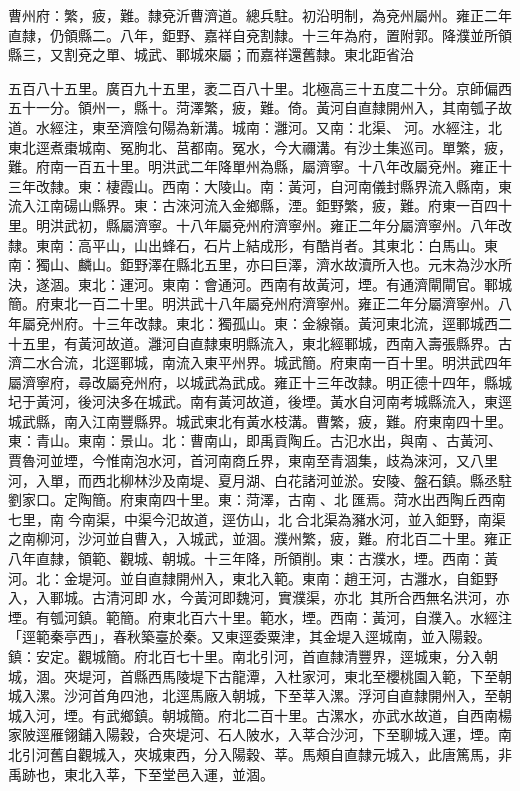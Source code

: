 \begin{pinyinscope}
曹州府：繁，疲，難。隸兗沂曹濟道。總兵駐。初沿明制，為兗州屬州。雍正二年直隸，仍領縣二。八年，鉅野、嘉祥自兗割隸。十三年為府，置附郭。降濮並所領縣三，又割兗之單、城武、鄆城來屬；而嘉祥還舊隸。東北距省治

五百八十五里。廣百九十五里，袤二百八十里。北極高三十五度二十分。京師偏西五十一分。領州一，縣十。菏澤繁，疲，難。倚。黃河自直隸開州入，其南瓠子故道。水經注，東至濟陰句陽為新溝。城南：灉河。又南：北渠、河。水經注，北東北逕煮棗城南、冤朐北、莒都南。冤水，今大禰溝。有沙土集巡司。單繁，疲，難。府南一百五十里。明洪武二年降單州為縣，屬濟寧。十八年改屬兗州。雍正十三年改隸。東：棲霞山。西南：大陵山。南：黃河，自河南儀封縣界流入縣南，東流入江南碭山縣界。東：古淶河流入金鄉縣，湮。鉅野繁，疲，難。府東一百四十里。明洪武初，縣屬濟寧。十八年屬兗州府濟寧州。雍正二年分屬濟寧州。八年改隸。東南：高平山，山出蜂石，石片上結成形，有酷肖者。其東北：白馬山。東南：獨山、麟山。鉅野澤在縣北五里，亦曰巨澤，濟水故瀆所入也。元末為沙水所決，遂涸。東北：運河。東南：會通河。西南有故黃河，堙。有通濟閘閘官。鄆城簡。府東北一百二十里。明洪武十八年屬兗州府濟寧州。雍正二年分屬濟寧州。八年屬兗州府。十三年改隸。東北：獨孤山。東：金線嶺。黃河東北流，逕鄆城西二十五里，有黃河故道。灉河自直隸東明縣流入，東北經鄆城，西南入壽張縣界。古濟二水合流，北逕鄆城，南流入東平州界。城武簡。府東南一百十里。明洪武四年屬濟寧府，尋改屬兗州府，以城武為武成。雍正十三年改隸。明正德十四年，縣城圮于黃河，後河決多在城武。南有黃河故道，後堙。黃水自河南考城縣流入，東逕城武縣，南入江南豐縣界。城武東北有黃水枝溝。曹繁，疲，難。府東南四十里。東：青山。東南：景山。北：曹南山，即禹貢陶丘。古氾水出，與南、古黃河、賈魯河並堙，今惟南泡水河，首河南商丘界，東南至青涸集，歧為淶河，又八里河，入單，而西北柳林沙及南堤、夏月湖、白花諸河並淤。安陵、盤石鎮。縣丞駐劉家口。定陶簡。府東南四十里。東：菏澤，古南、北匯焉。菏水出西陶丘西南七里，南今南渠，中渠今氾故道，逕仿山，北合北渠為瀦水河，並入鉅野，南渠之南柳河，沙河並自曹入，入城武，並涸。濮州繁，疲，難。府北百二十里。雍正八年直隸，領範、觀城、朝城。十三年降，所領削。東：古濮水，堙。西南：黃河。北：金堤河。並自直隸開州入，東北入範。東南：趙王河，古灉水，自鉅野入，入鄆城。古清河即水，今黃河即魏河，實濮渠，亦北，其所合西無名洪河，亦堙。有瓠河鎮。範簡。府東北百六十里。範水，堙。西南：黃河，自濮入。水經注「逕範秦亭西」，春秋築臺於秦。又東逕委粟津，其金堤入逕城南，並入陽穀。鎮：安定。觀城簡。府北百七十里。南北引河，首直隸清豐界，逕城東，分入朝城，涸。夾堤河，首縣西馬陵堤下古龍潭，入杜家河，東北至櫻桃園入範，下至朝城入漯。沙河首角四池，北逕馬廠入朝城，下至莘入漯。浮河自直隸開州入，至朝城入河，堙。有武鄉鎮。朝城簡。府北二百十里。古漯水，亦武水故道，自西南楊家陂逕雁翎鋪入陽穀，合夾堤河、石人陂水，入莘合沙河，下至聊城入運，堙。南北引河舊自觀城入，夾城東西，分入陽穀、莘。馬頰自直隸元城入，此唐篤馬，非禹跡也，東北入莘，下至堂邑入運，並涸。


\end{pinyinscope}
